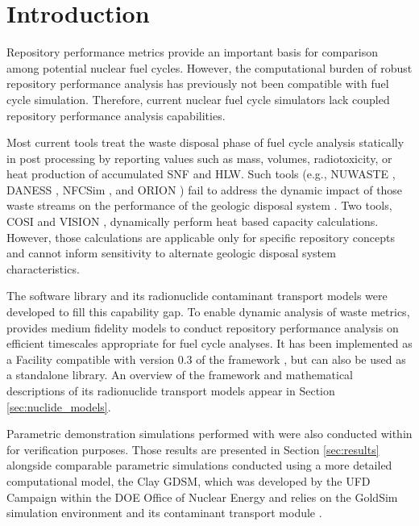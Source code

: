 \section{Introduction}\label{sec:introduction}
Repository performance metrics provide an important basis for comparison among
potential nuclear fuel cycles.
However, the computational
burden of robust repository performance analysis has previously not been
compatible with fuel cycle simulation.
Therefore, current nuclear fuel cycle simulators
lack coupled repository performance analysis capabilities.

Most current tools treat the waste disposal
phase of fuel cycle analysis statically in post processing by reporting
values such as mass, volumes, radiotoxicity, or heat production of accumulated
\gls{SNF} and \gls{HLW}. Such tools
(e.g.,
\gls{NUWASTE} \cite{abkowitz_nuclear_2010},
\gls{DANESS} \cite{van_den_durpel_daness:_2006},
\gls{NFCSim} \cite{schneider_nfcsim_2004}, and
ORION \cite{gregg_orion_2011})
fail to address the dynamic impact of those waste streams on the performance of the
geologic disposal system \cite{wilson_comparing_2011}.  Two tools, \gls{COSI}
\cite{boucher_international_2010} and \gls{VISION} \cite{yacout_vision_2006,
wilson_comparing_2011, radel_repository_2007, boucher_international_2010},
dynamically perform heat based capacity calculations.
However, those calculations are applicable only for specific
repository concepts and cannot inform sensitivity to alternate geologic disposal
system characteristics.

The \Cyder software library \cite{huff_cyder_2013} and its radionuclide
contaminant transport models were  developed to fill this capability gap.  To
enable dynamic analysis of waste metrics, \Cyder provides medium fidelity
models to conduct repository performance analysis on efficient timescales
appropriate for fuel cycle analyses. It has been implemented as a Facility
compatible with version 0.3 of the \Cyclus framework
\cite{wilson_cyclus:_2012}, but can also be used as a standalone library. An
overview of the \Cyder framework and mathematical descriptions of its
radionuclide transport models appear in Section \ref{sec:nuclide_models}.

Parametric demonstration simulations performed with \Cyder were also conducted
within \Cyclus for verification purposes. Those results are presented in
Section \ref{sec:results} alongside comparable parametric simulations conducted
using a more detailed computational model, the Clay \gls{GDSM}, which was
developed by the \gls{UFD} Campaign within the \gls{DOE} Office of Nuclear
Energy \cite{clayton_generic_2011} and relies on the GoldSim simulation
environment \cite{golder_associates_goldsim_2010-1} and its contaminant
transport module \cite{golder_associates_goldsim_2010-1}.

